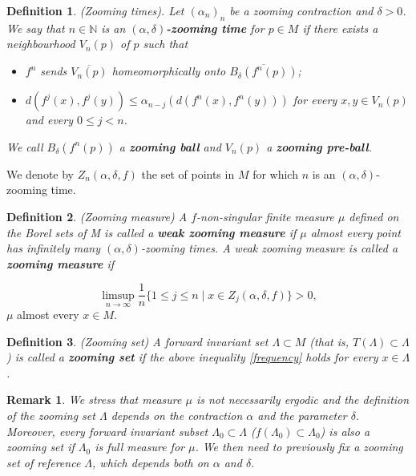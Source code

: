 \documentclass[12pt,a4paper]{amsart}
\theoremstyle{plain}
\newtheorem{definition}{Definition}[subsection]
\newtheorem{remark}{Remark}[subsection]
\begin{document}
\begin{definition}\label{times}
	(Zooming times). Let $(\alpha_{n})_{n}$ be a zooming contraction and $\delta>0$. We say that $n \in \mathbb{N}$ is an $(\alpha,\delta)$\textbf{\textit{-zooming time}} for $p \in M$ if there exists 
	a neighbourhood $V_{n}(p)$ of $p$ such that
	
	\begin{itemize}
		\item $f^{n}$ sends $\overline{V_{n}(p)}$ homeomorphically onto $\overline{B_{\delta}(f^{n}(p))}$;
		
		\item $d(f^{j}(x),f^{j}(y)) \leq \alpha_{n - j}(d(f^{n}(x),f^{n}(y)))$ for every $x,y \in V_{n}(p)$ and every $0 \leq j < n$.
	\end{itemize}
	
	We call $B_{\delta}(f^{n}(p))$ a \textbf{\textit{zooming ball}} and $V_{n}(p)$ a  \textbf{\textit{zooming pre-ball}}.
\end{definition}

We denote by $Z_{n}(\alpha,\delta,f)$ the set of points in $M$ for which $n$ is an $(\alpha, \delta)$- zooming time.

\begin{definition}
	(Zooming measure) A $f$-non-singular finite measure $\mu$ defined on the Borel sets of M is called a \textbf{\textit{weak zooming measure}} if $\mu$ almost every point has 
	infinitely many $(\alpha, \delta)$-zooming times. A weak zooming measure is called a \textbf{\textit{zooming measure}} if
\end{definition}
\begin{equation}\label{frequency}
	\displaystyle \limsup_{n \to \infty} \frac{1}{n} \{1 \leq j \leq n \mid x \in Z_{j}(\alpha,\delta,f)\} > 0,
\end{equation}
$\mu$ almost every $x \in M$.

\begin{definition}
	(Zooming set) A forward invariant set $\Lambda \subset M$ (that is, $T(\Lambda) \subset \Lambda$) is called a \textbf{\textit{zooming set}} if the above inequality \ref{frequency} holds for every $x \in \Lambda$. 
\end{definition}
\begin{remark}\label{fixed}
	We stress that measure $\mu$ is not necessarily ergodic and the definition of the zooming set $\Lambda$ depends on the contraction $\alpha$ and the parameter $\delta$. Moreover, every forward invariant subset $\Lambda_{0} \subset \Lambda$ ($f(\Lambda_{0}) \subset \Lambda_{0}$) is also a zooming set if $\Lambda_{0}$ is full measure for $\mu$. We then need to previously fix a zooming set of reference $\Lambda$, which depends both on $\alpha$ and $\delta$.
\end{remark}
\end{document}
